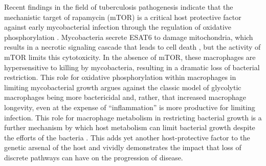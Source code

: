 Recent findings in the field of tuberculosis pathogenesis indicate that the mechanistic target of rapamycin (mTOR) is a critical host protective factor against early mycobacterial infection through the regulation of oxidative phosphorylation \citep{Pagan2022}. Mycobacteria secrete ESAT6 to damage mitochondria, which results in a necrotic signaling cascade that leads to cell death \citep{Roca2019}, but the activity of mTOR limits this cytotoxicity. In the absence of mTOR, these macrophages are hypersensitive to killing by mycobacteria, resulting in a dramatic loss of bacterial restriction. This role for oxidative phosphorylation within macrophages in limiting mycobacterial growth argues against the classic model of glycolytic macrophages being more bactericidal and, rather, that increased macrophage longevity, even at the expense of ``inflammation'' is more productive for limiting infection. This role for macrophage metabolism in restricting bacterial growth is a further mechanism by which host metabolism can limit bacterial growth despite the efforts of the bacteria \citep{Pernas2021}. This adds yet another host\hyp{}protective factor to the genetic arsenal of the host and vividly demonstrates the impact that loss of discrete pathways can have on the progression of disease. 

